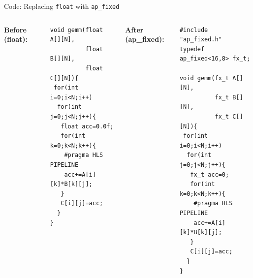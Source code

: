 \documentclass[aspectratio=169,12pt]{beamer}
\begin{document}
\begin{frame}[fragile]{Code: Replacing \texttt{float} with \texttt{ap\_fixed}}
\vspace{0.05cm}
\begin{columns}[T,totalwidth=\textwidth]

  {\small\color{Navy}\bfseries Before (float):}
  \vspace{2pt}
\begin{lstlisting}
void gemm(float A[][N],
          float B[][N],
          float C[][N]){
 for(int i=0;i<N;i++)
  for(int j=0;j<N;j++){
   float acc=0.0f;
   for(int k=0;k<N;k++){
    #pragma HLS PIPELINE
    acc+=A[i][k]*B[k][j];
   }
   C[i][j]=acc;
  }
}
\end{lstlisting}

  {\small\color{Navy}\bfseries After (ap\_fixed):}
  \vspace{2pt}
\begin{lstlisting}
#include "ap_fixed.h"
typedef ap_fixed<16,8> fx_t;

void gemm(fx_t A[][N],
          fx_t B[][N],
          fx_t C[][N]){
 for(int i=0;i<N;i++)
  for(int j=0;j<N;j++){
   fx_t acc=0;
   for(int k=0;k<N;k++){
    #pragma HLS PIPELINE
    acc+=A[i][k]*B[k][j];
   }
   C[i][j]=acc;
  }
}
\end{lstlisting}

\end{columns}
\end{frame}
\end{document}
